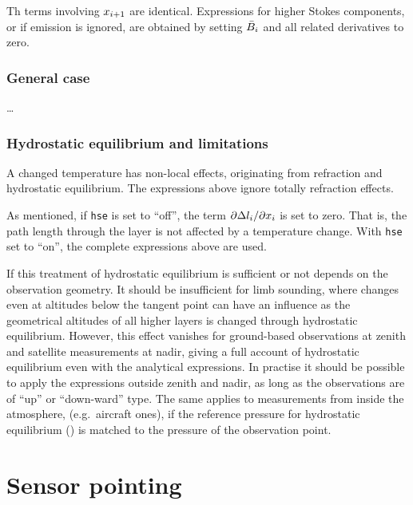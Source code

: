 Th terms involving $x_{i+1}$ are identical. Expressions for higher Stokes
components, or if emission is ignored, are obtained by setting
$\bar{B}_i$ and all related derivatives to zero.


\subsubsection{General case}
%
\dots



\subsubsection{Hydrostatic equilibrium and limitations}
%
A changed temperature has non-local effects, originating from refraction and
hydrostatic equilibrium. The expressions above ignore totally refraction
effects. 

As  mentioned,  if \verb|hse|  is  set  to  ``off'',  the term  $\partial  \Delta
l_{i}/\partial x_{i}$  is set  to  zero. That  is,  the path  length
through the layer is not affected  by a temperature change. With \verb|hse| set
to ``on'', the complete expressions above are used.

If this treatment of hydrostatic equilibrium is sufficient or not depends on
the observation geometry. It should be insufficient for limb sounding,
where changes even at altitudes below the tangent point can have an influence
as the geometrical altitudes of all higher layers is changed through
hydrostatic equilibrium.  However, this effect vanishes for
ground-based observations at zenith and satellite measurements at nadir, giving
a full account of hydrostatic equilibrium even with the analytical expressions.
In practise it should be possible to apply the expressions outside zenith and
nadir, as long as the observations are of ``up'' or ``down-ward'' type. The
same applies to measurements from inside the atmosphere, (e.g.\ aircraft ones),
if the reference pressure for hydrostatic equilibrium () is
matched to the pressure of the observation point.





\section{Sensor pointing}
\label{sec:wfuns:sensorpointing}

